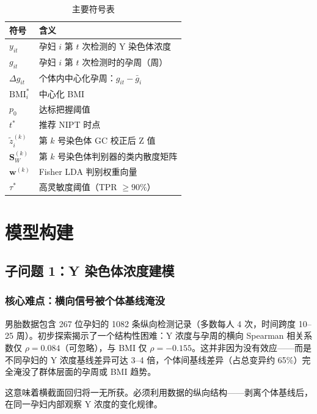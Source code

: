 \documentclass{mcm-paper}
\begin{document}
\begin{table}[H]
\centering
\caption{主要符号表}
\begin{tabular}{ll}
\toprule
符号 & 含义 \\
\midrule
$y_{it}$ & 孕妇 $i$ 第 $t$ 次检测的 Y 染色体浓度 \\
$g_{it}$ & 孕妇 $i$ 第 $t$ 次检测时的孕周（周） \\
$\Delta g_{it}$ & 个体内中心化孕周：$g_{it}-\bar{g}_i$ \\
$\mathrm{BMI}_i^*$ & 中心化 BMI \\
$p_0$ & 达标把握阈值 \\
$t^*$ & 推荐 NIPT 时点 \\
$\tilde{z}_i^{(k)}$ & 第 $k$ 号染色体 GC 校正后 Z 值 \\
$\mathbf{S}_W^{(k)}$ & 第 $k$ 号染色体判别器的类内散度矩阵 \\
$\mathbf{w}^{(k)}$ & Fisher LDA 判别权重向量 \\
$\tau^*$ & 高灵敏度阈值（TPR $\geq 90\%$） \\
\bottomrule
\end{tabular}
\end{table}

\section{模型构建}

\subsection{子问题 1：Y 染色体浓度建模}

\subsubsection{核心难点：横向信号被个体基线淹没}

男胎数据包含 267 位孕妇的 1082 条纵向检测记录（多数每人 4 次，时间跨度 10--25 周）。初步探索揭示了一个结构性困难：Y 浓度与孕周的横向 Spearman 相关系数仅 $\rho=0.084$（可忽略），与 BMI 仅 $\rho=-0.155$。这并非因为没有效应——而是不同孕妇的 Y 浓度基线差异可达 3--4 倍，个体间基线差异（占总变异约 65\%）完全淹没了群体层面的孕周或 BMI 趋势。

这意味着横截面回归将一无所获。必须利用数据的纵向结构——剥离个体基线后，在同一孕妇内部观察 Y 浓度的变化规律。
\end{document}

